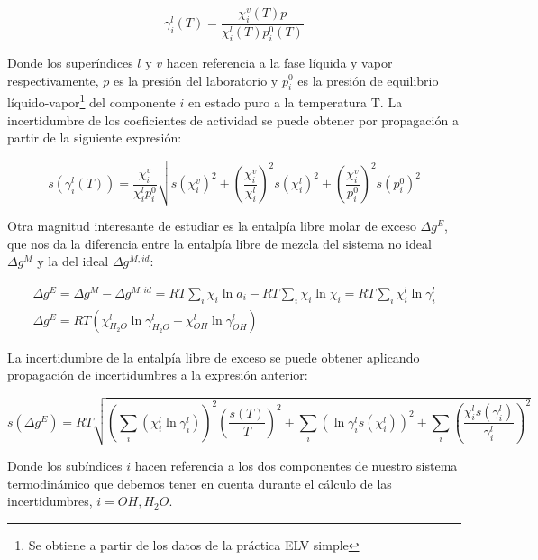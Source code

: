 \documentclass[a4paper,12pt,titlepage]{article}
\begin{document}
\begin{equation}
    \gamma_i^l (T) = \frac{\chi_i^v (T) p}{\chi_i^l(T)p_i^0(T)}
    \label{gamma}
\end{equation}

Donde los superíndices $l$ y $v$ hacen referencia a la fase líquida y vapor respectivamente, $p$ es la presión del laboratorio y $p_i^0$ es la presión de equilibrio líquido-vapor\footnote{Se obtiene a partir de los datos de la práctica ELV simple} del componente $i$ en estado puro a la temperatura T. La incertidumbre de los coeficientes de actividad se puede obtener por propagación a partir de la siguiente expresión:

\begin{equation}
    s(\gamma^l_i (T)) = \frac{\chi^v_i}{\chi^l_i p_i^0} \sqrt{ s(\chi_i^v)^2 + \left( \frac{\chi_i^v}{\chi_i^l} \right)^2 s(\chi_i^l)^2 + \left(\frac{\chi_i^v}{p_i^0}\right)^2 s(p_i^0)^2}
    \label{inc_gamma}
\end{equation}

Otra magnitud interesante de estudiar es la entalpía libre molar de exceso $\Delta g^{E}$, que nos da la diferencia entre la entalpía libre de mezcla del sistema no ideal $\Delta g^M$ y la del ideal $\Delta g^{M,id}$:

\begin{equation}
    \begin{gathered}
    \Delta g^{E} = \Delta g^M - \Delta g^{M,id} = RT \sum_i \chi_i \ln a_i - RT \sum_i \chi_i \ln \chi_i = RT \sum_i \chi_i^l \ln \gamma_i^l \\
    \Delta g^{E} = RT (\chi_{H_2O}^l \ln \gamma_{H_2O}^l + \chi_{OH}^l \ln \gamma_{OH}^l )
    \end{gathered}
    \label{delta_g}
\end{equation}

La incertidumbre de la entalpía libre de exceso se puede obtener aplicando propagación de incertidumbres a la expresión anterior:

\begin{equation}
    s(\Delta g^{E}) = RT \sqrt{ \left( \sum_i (\chi_i^l \ln \gamma_i^l) \right)^2 \left( \frac{s(T)}{T} \right)^2 + \sum_i \left(\ln \gamma_i^l s(\chi_i^l)\right)^2 +\sum_i \left( \frac{\chi_i^ls(\gamma_i^l)}{\gamma_i^l} \right)^2}
\end{equation}

Donde los subíndices $i$ hacen referencia a los dos componentes de nuestro sistema termodinámico que debemos tener en cuenta durante el cálculo de las incertidumbres, $i=OH,H_2O$.
\end{document}
